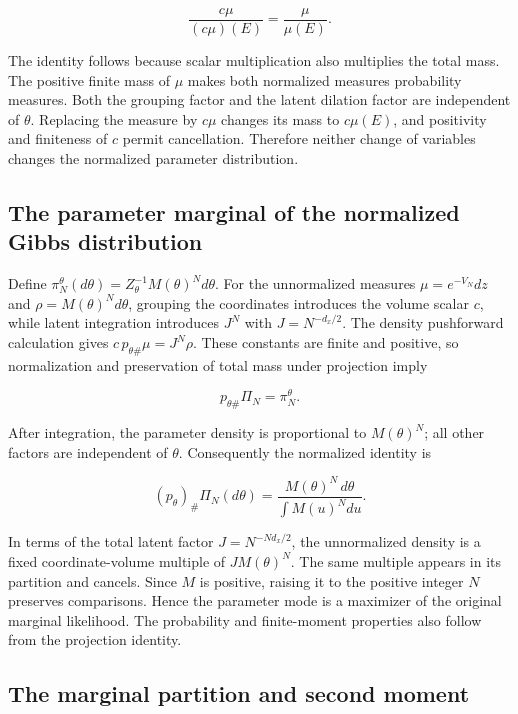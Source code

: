 \documentclass[11pt,a4paper]{article}
\begin{document}
\[\frac{c\mu}{(c\mu)(E)}=\frac{\mu}{\mu(E)}.\]

The identity follows because scalar multiplication also multiplies the total mass. The positive finite mass of \(\mu\) makes both normalized measures probability measures. Both the grouping factor and the latent dilation factor are independent of \(\theta\). Replacing the measure by \(c\mu\) changes its mass to \(c\mu(E)\), and positivity and finiteness of \(c\) permit cancellation. Therefore neither change of variables changes the normalized parameter distribution.



\subsection{\texorpdfstring{The parameter marginal of the normalized Gibbs distribution}{The parameter marginal of the normalized Gibbs distribution}}


Define \(\pi_N^\theta(d\theta)=Z_\theta^{-1}M(\theta)^N d\theta\). For the unnormalized measures \(\mu=e^{-V_N}dz\) and \(\rho=M(\theta)^Nd\theta\), grouping the coordinates introduces the volume scalar \(c\), while latent integration introduces \(J^N\) with \(J=N^{-d_x/2}\). The density pushforward calculation gives \(c\,p_{\theta\#}\mu=J^N\rho\). These constants are finite and positive, so normalization and preservation of total mass under projection imply

\[p_{\theta\#}\Pi_N=\pi_N^\theta.\]

After integration, the parameter density is proportional to \(M(\theta)^N\); all other factors are independent of \(\theta\). Consequently the normalized identity is

\[(p_\theta)_\#\Pi_N(d\theta)=\frac{M(\theta)^N\,d\theta}{\int M(u)^Ndu}.\]

In terms of the total latent factor \(J=N^{-Nd_x/2}\), the unnormalized density is a fixed coordinate-volume multiple of \(J M(\theta)^N\). The same multiple appears in its partition and cancels. Since \(M\) is positive, raising it to the positive integer \(N\) preserves comparisons. Hence the parameter mode is a maximizer of the original marginal likelihood. The probability and finite-moment properties also follow from the projection identity.



\subsection{\texorpdfstring{The marginal partition and second moment}{The marginal partition and second moment}}
\end{document}
